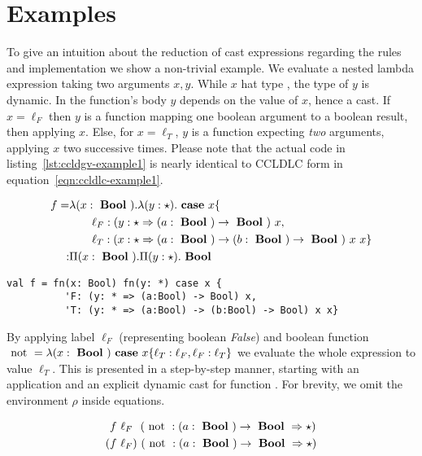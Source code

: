 \newpage

\section{Examples}

To give an intuition about the reduction of cast expressions regarding the rules and implementation we show a non-trivial example. We evaluate a nested lambda expression taking two arguments $x,y$. While $x$ hat type \Bool, the type of $y$ is dynamic. In the function's body $y$ depends on the value of $x$, hence a cast. If $x=\ell_F$ then $y$ is a function mapping one boolean argument to a boolean result, then applying $x$. Else, for $x=\ell_T$, $y$ is a function expecting \emph{two} arguments, applying $x$ two successive times. Please note that the actual code in listing~\ref{lst:ccldgv-example1} is nearly identical to CCLDLC form in equation~\ref{eqn:ccldlc-example1}.

\begin{equation}\label{eqn:ccldlc-example1}
\begin{split}
f = & \lambda (x: \text{ \textbf{Bool} })
. \lambda (y: \star )
. \text{ \textbf{case} } x \{ \\
& \qquad \ell_F: (y : \star \Rightarrow (a:\text{ \textbf{Bool} }) \rightarrow \text{ \textbf{Bool} })~x, \\
& \qquad \ell_T: (x : \star \Rightarrow (a:\text{ \textbf{Bool} }) \rightarrow (b:\text{ \textbf{Bool} }) \rightarrow \text{ \textbf{Bool} })~x~x \} \\
: & \Pi(x : \text{ \textbf{Bool} }) . \Pi (y: \star ) . \text{ \textbf{Bool} }
\end{split}
\end{equation}

\begin{lstlisting}[language=ldgv,
  label=lst:ccldgv-example1,
  caption=CCLDGV example ``dependent function cast'']
val f = fn(x: Bool) fn(y: *) case x {
          'F: (y: * => (a:Bool) -> Bool) x,
          'T: (y: * => (a:Bool) -> (b:Bool) -> Bool) x x}
\end{lstlisting}

By applying label $\ell_F$ (representing boolean \emph{False}) and boolean function $\text{ not } = \lambda (x:\text{ \textbf{Bool} }) \text{ \textbf{case} } x \{ \ell_T: \ell_F, \ell_F: \ell_T\}$ we evaluate the whole expression to value $\ell_T$. This is presented in a step-by-step manner, starting with an application and an explicit dynamic cast for function \notf. For brevity, we omit the environment $\rho$ inside equations.

\begin{align}
& f~\ell_F~~(\text{ not } : (a:\text{ \textbf{Bool} }) \rightarrow \text{ \textbf{Bool} } \Rightarrow \star) \\
( & f~\ell_F)~(\text{ not } : (a:\text{ \textbf{Bool} }) \rightarrow \text{ \textbf{Bool} } \Rightarrow \star)
\end{align}

